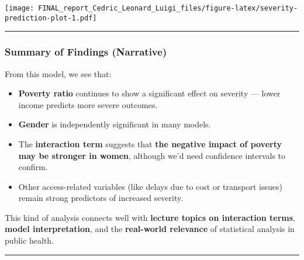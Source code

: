 \documentclass[
]{article}
\providecommand{\tightlist}{%
  \setlength{\itemsep}{0pt}\setlength{\parskip}{0pt}}
\begin{document}
\texttt{[image: FINAL\_report\_Cedric\_Leonard\_Luigi\_files/figure-latex/severity-prediction-plot-1.pdf]}

\begin{center}\rule{0.5\linewidth}{0.5pt}\end{center}

\subsubsection{Summary of Findings
(Narrative)}\label{summary-of-findings-narrative}

From this model, we see that:

\begin{itemize}
\tightlist
\item
  \textbf{Poverty ratio} continues to show a significant effect on
  severity --- lower income predicts more severe outcomes.
\item
  \textbf{Gender} is independently significant in many models.
\item
  The \textbf{interaction term} suggests that \textbf{the negative
  impact of poverty may be stronger in women}, although we'd need
  confidence intervals to confirm.
\item
  Other access-related variables (like delays due to cost or transport
  issues) remain strong predictors of increased severity.
\end{itemize}

This kind of analysis connects well with \textbf{lecture topics on
interaction terms}, \textbf{model interpretation}, and the
\textbf{real-world relevance} of statistical analysis in public health.

\begin{center}\rule{0.5\linewidth}{0.5pt}\end{center}
\end{document}
